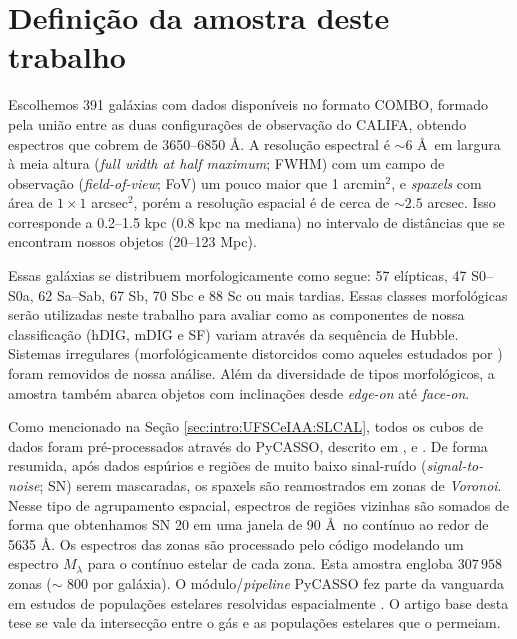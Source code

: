 \section{Definição da amostra deste trabalho}
\label{sec:sample:definicao}

Escolhemos 391 galáxias com dados disponíveis no formato COMBO, formado pela união entre as duas configurações de observação do CALIFA, obtendo espectros que cobrem de 3650--6850 \AA. A resolução espectral é $\sim 6$ \AA\ em largura à meia altura ({\em full width at half maximum}; FWHM) com um campo de observação ({\em field-of-view}; FoV) um pouco maior que 1 arcmin${}^2$, e {\em spaxels} com área de $1 \times 1$ arcsec$^2$, porém a resolução espacial é de cerca de $\sim 2.5$ arcsec. Isso corresponde a 0.2--1.5 kpc (0.8 kpc na mediana) no intervalo de distâncias que se encontram nossos objetos (20--123 Mpc).

Essas galáxias se distribuem morfologicamente como segue: 57 elípticas, 47 S0--S0a, 62 Sa--Sab, 67 Sb, 70 Sbc e 88 Sc ou mais tardias. Essas classes morfológicas serão utilizadas neste trabalho para avaliar como as componentes de nossa classificação (hDIG, mDIG e SF) variam através da sequência de Hubble. Sistemas irregulares (morfológicamente distorcidos como aqueles estudados por \citealt{Wild.etal.2014, BB.etal.2015b, BB.etal.2015a, CortijoFerrero.etal.2017a, CortijoFerrero.etal.2017b}) foram removidos de nossa análise. Além da diversidade de tipos morfológicos, a amostra também abarca objetos com inclinações desde {\em edge-on} até {\em face-on}.

Como mencionado na Seção \ref{sec:intro:UFSCeIAA:SLCAL}, todos os cubos de dados foram pré-processados através do PyCASSO, descrito em \citet{CidFernandes.etal.2013a}, \citet{CidFernandes.etal.2014a} e \citet{deAmorim.etal.2017}. De forma resumida, após dados espúrios e regiões de muito baixo sinal-ruído ({\em signal-to-noise}; SN) serem mascaradas, os spaxels são reamostrados em zonas de {\em Voronoi}. Nesse tipo de agrupamento espacial, espectros de regiões vizinhas são somados de forma que obtenhamos SN 20 em uma janela de 90 \AA\ no contínuo ao redor de 5635 \AA. Os espectros das zonas são processado pelo código \starlight \citep{CidFernandes.etal.2005a} modelando um espectro $M_\lambda$ para o contínuo estelar de cada zona. Esta amostra engloba $307\,958$ zonas ($\sim$ 800 por galáxia). O módulo/{\em pipeline} PyCASSO fez parte da vanguarda em estudos de populações estelares resolvidas espacialmente \citep{Perez.etal.2013, GonzalezDelgado.etal.2014b, GonzalezDelgado.etal.2015a, GonzalezDelgado.etal.2016a, GonzalezDelgado.etal.2017}. O artigo base desta tese se vale da intersecção entre o gás e as populações estelares que o permeiam.


